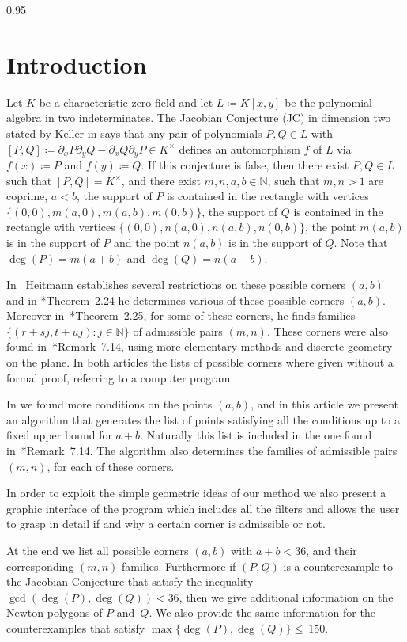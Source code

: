 \documentclass[reqno,a4paper,twoside]{amsart}
\theoremstyle{definition}
\theoremstyle{remark}
\begin{document}
\begin{spacing}{0.95}

\section*{Introduction}

Let $K$ be a characteristic zero field and let $L\coloneqq K[x,y]$ be the polynomial algebra in two indeterminates. The Jacobian Conjecture (JC) in dimension two stated by Keller in \cite{K} says that any pair of polynomials $P,Q\in L$ with $[P,Q]\coloneqq \partial_x P \partial_y Q - \partial_x Q \partial_y P\in K^{\times}$ defines an automorphism $f$ of $L$ via $f(x)\coloneqq P$ and $f(y)\coloneqq Q$. If this conjecture is false, then there exist $P,Q\in L$ such that $[P,Q]=K^{\times}$, and there exist $m,n,a,b\in \mathds{N}$, such that $m,n>1$ are coprime, $a<b$, the support of $P$ is contained in the rectangle with vertices $\{(0,0), m(a,0),m(a,b),m(0,b)\}$, the support of $Q$ is contained in the rectangle with vertices $\{(0,0),n(a,0),n(a,b),n(0,b)\}$, the point $m(a,b)$ is in the support of $P$ and the point $n(a,b)$ is in the support of $Q$. Note that $\deg(P)=m(a+b)$ and $\deg(Q)=n(a+b)$.

In~\cite{H} Heitmann establishes several restrictions on these possible corners $(a,b)$ and in \cite{H}*{Theorem~2.24} he determines various of these possible corners $(a,b)$. Moreover in~\cite{H}*{Theorem~2.25}, for some of these corners, he finds families $\{(r+sj,t+uj):j\in\mathds{N}\}$ of admissible pairs $(m,n)$. These corners were also found in~\cite{GGV1}*{Remark~7.14}, using more elementary methods and discrete geometry on the plane. In both articles the lists of possible corners where given without a formal proof, referring to a computer program.

In \cite{GGV2} we found more conditions on the points $(a,b)$, and in this article we present an algorithm that generates the list of points satisfying all the conditions up to a fixed upper bound for $a+b$. Naturally this list is included in the one found in~\cite{GGV1}*{Remark~7.14}. The algorithm also determines the families of admissible pairs $(m,n)$, for each of these corners.

In order to exploit the simple geometric ideas of our method we also present a graphic interface of the program which includes all the filters and allows the user to grasp in detail if and why a certain corner is admissible or not.

At the end we list all possible corners $(a,b)$ with $a\!+\!b\!<\! 36$, and their corresponding $(m,n)$-families. Furthermore if $(P,Q)$ is a counterexample to the Jacobian Conjecture that satisfy the inequality $\gcd(\deg(P),\deg(Q))< 36$, then we give additional information on the Newton polygons of $P$ and~$Q$. We also provide the same information for the counterexamples that satisfy $\max\{\deg(P),\deg(Q)\}\le~150$.


\end{spacing}
\end{document}
